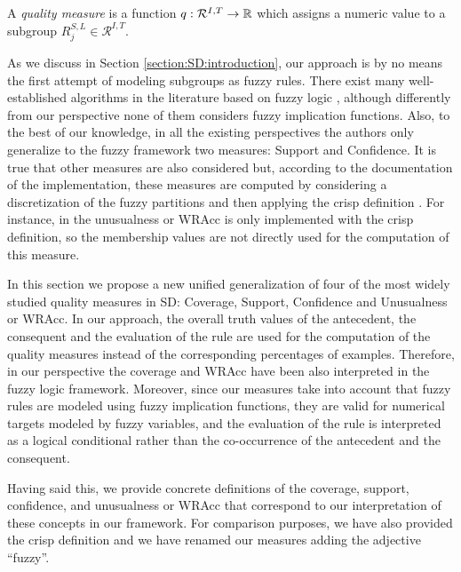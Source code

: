\begin{definition}
	A \emph{quality measure} is a function $q: \mathcal{R}^{I,T} \to \mathbb{R}$ which assigns a numeric value to a subgroup $R^{S,L}_j \in \mathcal{R}^{I,T}$.
\end{definition}

As we discuss in Section \ref{section:SD:introduction}, our approach is by no means the first attempt of modeling subgroups as fuzzy rules. There exist many well-established algorithms in the literature based on fuzzy logic \cite{Carmona2010,Carmona2011,Luna2014,Carmona2015,Berlanga2006,delJesus2007B,delJesus2007}, although differently from our perspective none of them considers fuzzy implication functions. Also, to the best of our knowledge, in all the existing perspectives the authors only  generalize to the fuzzy framework two measures: Support and Confidence. It is true that other measures are also considered but, according to the documentation of the implementation, these measures are computed by considering a discretization of the fuzzy partitions and then applying the crisp definition \cite{SDEFSR}. For instance, in \cite{SDEFSR} the unusualness or WRAcc is only implemented with the crisp definition, so the membership values are not directly used for the computation of this measure. 

In this section we propose a new unified generalization of four of the most widely studied quality measures in SD: Coverage, Support, Confidence and Unusualness or WRAcc. In our approach, the overall truth values of the antecedent, the consequent and the evaluation of the rule are used for the computation of the quality measures instead of the corresponding percentages of examples. Therefore, in our perspective the coverage and WRAcc have been also interpreted in the fuzzy logic framework. Moreover, since our measures take into account that fuzzy rules are modeled using fuzzy implication functions, they are valid for numerical targets modeled by fuzzy variables, and the evaluation of the rule is interpreted as a logical conditional rather than the co-occurrence of the antecedent and the consequent.

Having said this, we provide concrete definitions of the coverage, support, confidence, and unusualness or WRAcc that correspond to our interpretation of these concepts in our framework. For comparison purposes, we have also provided the crisp definition and we have renamed our measures adding the adjective ``fuzzy''.

